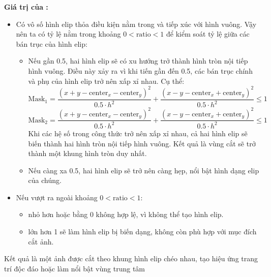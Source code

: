 \textbf{Giá trị của :}
\begin{itemize}
	\item Có vô số hình elip thỏa điều kiện nằm trong và tiếp xúc với hình vuông. Vậy nên ta có tỷ lệ  nằm trong khoảng \(0 < \text{ratio} < 1\) để kiểm soát tỷ lệ giữa các bán trục của hình elip:
	      \begin{itemize}
		      \item Nếu  gần 0.5, hai hình elip sẽ có xu hướng trở thành hình tròn nội tiếp hình vuông. Điều này xảy ra vì khi  tiến gần đến 0.5, các bán trục chính và phụ của hình elip trở nên xấp xỉ nhau. Cụ thể:
		            \[
			            \text{Mask}_1 = \frac{(x + y - \text{center}_x - \text{center}_y)^2}{0.5 \cdot h^2} + \frac{(x - y - \text{center}_x + \text{center}_y)^2}{0.5 \cdot h^2} \leq 1
		            \]
		            \[
			            \text{Mask}_2 = \frac{(x + y - \text{center}_x - \text{center}_y)^2}{0.5 \cdot h^2} + \frac{(x - y - \text{center}_x + \text{center}_y)^2}{0.5 \cdot h^2} \leq 1
		            \]
		            Khi các hệ số trong công thức trở nên xấp xỉ nhau, cả hai hình elip sẽ biến thành hai hình tròn nội tiếp hình vuông. Kết quả là vùng cắt sẽ trở thành một khung hình tròn duy nhất.
		      \item Nếu  càng xa 0.5, hai hình elip sẽ trở nên càng hẹp, nổi bật hình dạng elip của chúng.
	      \end{itemize}
	\item Nếu  vượt ra ngoài khoảng \(0 < \text{ratio} < 1\):
	      \begin{itemize}
		      \item {} nhỏ hơn hoặc bằng 0 không hợp lệ, vì không thể tạo hình elip.
		      \item {} lớn hơn 1 sẽ làm hình elip bị biến dạng, không còn phù hợp với mục đích cắt ảnh.
	      \end{itemize}
\end{itemize}

Kết quả là một ảnh được cắt theo khung hình elip chéo nhau, tạo hiệu ứng trang trí độc đáo hoặc làm nổi bật vùng trung tâm